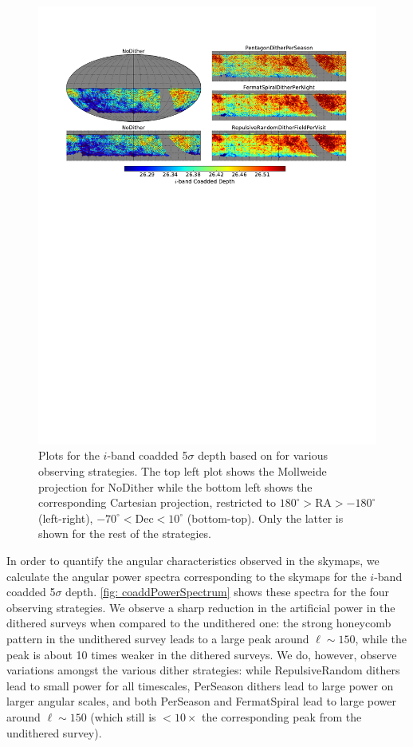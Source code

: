 \begin{figure}[!htb]
      \centering\includegraphics[width=\linewidth, trim={50 470 55 70},clip=true]{figs/awan_minion1016_coaddSkymaps.pdf}
\caption{Plots for the $i$-band coadded 5$\sigma$ depth based on  for various observing strategies. The top left plot shows the Mollweide projection for NoDither while the bottom left shows the corresponding Cartesian projection, restricted to $180^\circ>$RA$>-180^\circ$ (left-right), $-70^\circ<$Dec$<10^\circ$ (bottom-top). Only the latter is shown for the rest of the strategies. }
\label{fig: coaddSkymaps}
\end{figure}

In order to quantify the angular characteristics observed in the skymaps, we calculate the angular power spectra corresponding to the skymaps for the $i$-band coadded 5$\sigma$ depth. \autoref{fig: coaddPowerSpectrum} shows these spectra for the four observing strategies. We observe a sharp reduction in the artificial power in the dithered surveys when compared to the undithered one: the strong honeycomb pattern in the undithered survey leads to a large peak around $\ell\sim150$, while the peak is about 10 times weaker in the dithered surveys. We do, however, observe variations amongst the various dither strategies: while RepulsiveRandom dithers lead to small power for all timescales, PerSeason dithers lead to large power on larger angular scales, and both PerSeason and FermatSpiral lead to large power around $\ell\sim150$ (which still is $<10\times$ the corresponding peak from the undithered survey).

